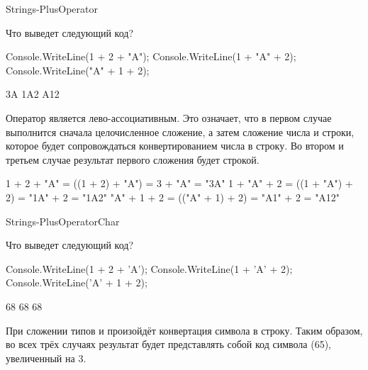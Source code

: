 \begin{defproblem}{Strings-PlusOperator}
\begin{onlyproblem}
  Что выведет следующий код?
  \begin{source}
  Console.WriteLine(1 + 2 + "A");
  Console.WriteLine(1 + "A" + 2);
  Console.WriteLine("A" + 1 + 2);
  \end{source}
\end{onlyproblem}
\begin{onlysolution}
  \begin{source}
  3A
  1A2
  A12
  \end{source}
  Оператор \code{+} является лево-ассоциативным. Это означает, что в первом случае выполнится сначала целочисленное сложение, а затем сложение числа и строки, которое будет сопровождаться конвертированием числа в строку. Во втором и третьем случае результат первого сложения будет строкой.
  \begin{source}
  1 + 2 + "A" = ((1 + 2) + "A") = 3 + "A"  = "3A"
  1 + "A" + 2 = ((1 + "A") + 2) = "1A" + 2 = "1A2"
  "A" + 1 + 2 = (("A" + 1) + 2) = "A1" + 2 = "A12"
  \end{source}
\end{onlysolution}
\end{defproblem}
\begin{defproblem}{Strings-PlusOperatorChar}
\begin{onlyproblem}
  Что выведет следующий код?
  \begin{source}
  Console.WriteLine(1 + 2 + 'A');
  Console.WriteLine(1 + 'A' + 2);
  Console.WriteLine('A' + 1 + 2);
  \end{source}
\end{onlyproblem}
\begin{onlysolution}
  \begin{source}
  68
  68
  68
  \end{source}
  При сложении типов  и  произойдёт конвертация символа в строку. Таким образом, во всех трёх случаях результат будет представлять собой код символа  (65), увеличенный на 3.
\end{onlysolution}
\end{defproblem}
